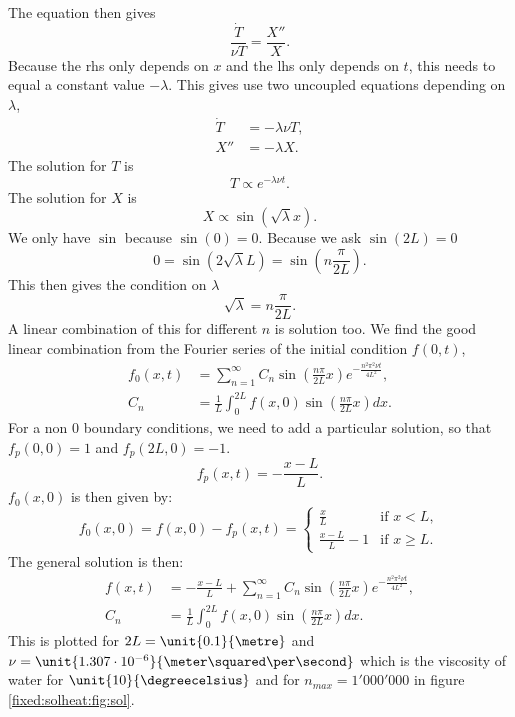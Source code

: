 The equation then gives
\begin{equation}
	\frac{\dot{T}}{\nu T}=\frac{X''}{X}.
\end{equation}
Because the rhs only depends on $x$ and the lhs only depends on $t$, this needs to equal a constant value $-\lambda$.
This gives use two uncoupled equations depending on $\lambda$,
\begin{align}
\dot{T}&=-\lambda \nu T,\\
X''&=-\lambda X.
\end{align}
The solution for $T$ is
\begin{equation}
  T\propto e^{-\lambda \nu t}.
\end{equation}
The solution for $X$ is
\begin{equation}
	X\propto \sin(\sqrt{\lambda} x).
\end{equation}
We only have $\sin$ because $\sin(0)=0$.
Because we ask $\sin(2L)=0$
\begin{equation}
	0=\sin(2\sqrt{\lambda} L)=\sin\left(n\frac{\pi}{2L}\right).
\end{equation}
This then gives the condition on $\lambda$
\begin{equation}
	\sqrt{\lambda}=n\frac{\pi}{2L}.
\end{equation}
A linear combination of this for different $n$ is solution too.
We find the good linear combination from the Fourier series of the initial condition $f(0,t)$,
\begin{align}
  f_0(x,t)&=\sum_{n=1}^{\infty}C_{n}\sin\left(\frac{n\pi}{2L}x\right)e^{-\frac{n^2\pi^2\nu t}{4L^2}},\\
  C_{n}&=\frac{1}{L}\int_{0}^{2L}f(x,0)\sin\left(\frac{n\pi}{2L}x\right) dx.
\end{align}
For a non 0 boundary conditions, we need to add a particular solution, so that $f_p(0,0)=1$ and $f_p(2L,0)=-1$.
\begin{equation}
	f_{p}(x,t)=-\frac{x-L}{L}.
\end{equation}
$f_{0}(x,0)$ is then given by:
\begin{equation}
  f_{0}(x,0)=f(x,0)-f_{p}(x,t)=\begin{cases}
                               	\frac{x}{L}&\text{if $x<L$},\\
                               	\frac{x-L}{L}-1&\text{if $x\geq L$.}
                               \end{cases}
\end{equation}
The general solution is then:
\begin{align}
  f(x,t)&=-\frac{x-L}{L}+\sum_{n=1}^{\infty}C_{n}\sin\left(\frac{n\pi}{2L}x\right)e^{-\frac{n^2\pi^2\nu t}{4L^2}},\\
  C_{n}&=\frac{1}{L}\int_{0}^{2L}f(x,0)\sin\left(\frac{n\pi}{2L}x\right) dx.
\end{align}
This is plotted for $2L=\unit{0.1}{\metre}$ and $\nu=\unit{1.307\cdot 10^{-6}}{\meter \squared \per \second}$ which is the viscosity of water for $\unit{10}{\degreecelsius}$ and for $n_{max}=1'000'000$ in figure \ref{fixed:solheat:fig:sol}.

